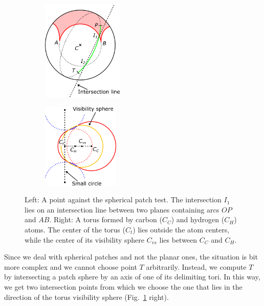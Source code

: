\begin{figure}[htp]
  \centering
  \begin{subfigure}[c]{0.52\columnwidth}
    \centering
    \includegraphics[height=1.9in]{image/patch.png}
  \end{subfigure}%
  \quad
  \begin{subfigure}[c]{0.44\columnwidth}
    \centering
    \includegraphics[height=1.6in]{image/outer.png}
  \end{subfigure}
\caption{Left: A point against the spherical patch test. The intersection $I_1$ lies on an intersection line between two planes containing arcs $OP$ and $AB$. Right: A torus formed by carbon ($C_C$) and hydrogen ($C_H$) atoms. The center of the torus ($C_{t}$) lies outside the atom centers, while the center of its visibility sphere $C_{vs}$ lies between $C_C$ and $C_H$.}
\label{fig:outer-point}
\end{figure}

Since we deal with spherical patches and not the planar ones, the situation is bit more complex and we cannot choose point $T$ arbitrarily. 
Instead, we compute $T$ by intersecting a patch sphere by an axis of one of its delimiting tori.
In this way, we get two intersection points from which we choose the one that lies in the direction of the torus visibility sphere (Fig.~\ref{fig:outer-point} right).

